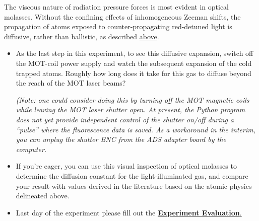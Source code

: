 \documentclass{../lab}
\begin{document}
The viscous nature of radiation pressure forces is most evident in optical molasses. Without the confining effects of inhomogeneous Zeeman shifts, the propagation of atoms exposed to counter-propagating red-detuned light is diffusive, rather than ballistic, as described \hyperref[subsubsec:MeasuringMOTTemperature]{above}.

\begin{itemize}
    \item As the last step in this experiment, to see this diffusive expansion, switch off the MOT-coil power supply and watch the subsequent expansion of the cold trapped atoms. Roughly how long does it take for this gas to diffuse beyond the reach of the MOT laser beams?

    \emph{(Note: one could consider doing this by turning off the MOT magnetic coils while leaving the MOT laser shutter open. At present, the Python program does not yet provide independent control of the shutter on/off during a ``pulse'' where the fluorescence data is saved. As a workaround in the interim, you can unplug the shutter BNC from the ADS adapter board by the computer.}

    \item If you're eager, you can use this visual inspection of optical molasses to determine the diffusion constant for the light-illuminated gas, and compare your result with values derived in the literature based on the atomic physics delineated above.

    \item Last day of the experiment please fill out the \href{\ExperimentEvaluation}{\textbf{Experiment Evaluation}.}
\end{itemize}

\end{document}
